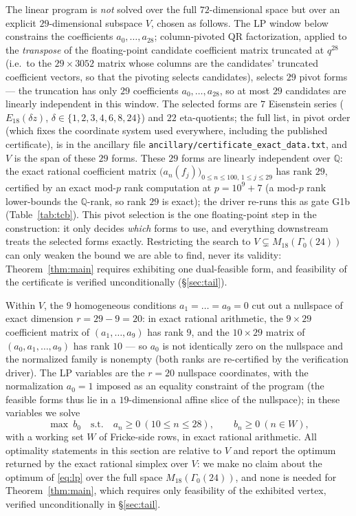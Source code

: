 \documentclass[11pt]{article}
\theoremstyle{remark}
\begin{document}
The linear program is \emph{not} solved over the full $72$-dimensional
space but over an explicit $29$-dimensional subspace $V$, chosen as
follows. The LP window below constrains the coefficients
$a_0,\dots,a_{28}$; column-pivoted QR factorization, applied to the
\emph{transpose} of the floating-point candidate coefficient matrix
truncated at $q^{28}$ (i.e.\ to the $29\times3052$ matrix whose
columns are the candidates' truncated coefficient vectors, so that the
pivoting selects candidates), selects $29$ pivot forms --- the
truncation has only $29$ coefficients $a_0,\dots,a_{28}$, so at most
$29$ candidates are linearly independent in this window. The selected forms are $7$ Eisenstein series
($E_{18}(\delta z)$, $\delta\in\{1,2,3,4,6,8,24\}$) and $22$
eta-quotients; the full list, in pivot order (which fixes the
coordinate system used everywhere, including the published
certificate), is in the ancillary file
\texttt{ancillary/certificate\_exact\_data.txt}, and $V$ is the span
of these $29$ forms. These $29$ forms are linearly independent over
$\mathbb{Q}$: the exact rational coefficient matrix
$\bigl(a_n(f_j)\bigr)_{0\le n\le100,\,1\le j\le29}$ has rank $29$,
certified by an exact mod-$p$ rank computation at $p=10^9+7$ (a mod-$p$
rank lower-bounds the $\mathbb{Q}$-rank, so rank $29$ is exact); the
driver re-runs this as gate G1b (Table~\ref{tab:tcb}). This pivot selection is the one floating-point
step in the construction: it only decides \emph{which} forms to use,
and everything downstream treats the selected forms exactly.
Restricting the search to $V\subsetneq M_{18}(\Gamma_0(24))$ can only
weaken the bound we are able to find, never its validity:
Theorem~\ref{thm:main} requires exhibiting one dual-feasible form, and
feasibility of the certificate is verified unconditionally
(\S\ref{sec:tail}).

Within $V$, the $9$ homogeneous conditions $a_1=\dots=a_9=0$ cut out a
nullspace of exact dimension $r=29-9=20$: in exact rational arithmetic,
the $9\times29$ coefficient matrix of $(a_1,\dots,a_9)$ has rank $9$,
and the $10\times29$ matrix of $(a_0,a_1,\dots,a_9)$ has rank $10$ ---
so $a_0$ is not identically zero on the nullspace and the normalized
family is nonempty (both ranks are re-certified by the verification
driver). The LP variables are
the $r=20$ nullspace coordinates, with the normalization $a_0=1$
imposed as an equality constraint of the program (the feasible forms
thus lie in a $19$-dimensional affine slice of the nullspace); in these
variables we solve
\begin{equation}\label{eq:lp}
\max\ b_0
\quad\text{s.t.}\quad
a_n\ge0\ (10\le n\le 28),\qquad
b_n\ge0\ (n\in W),
\end{equation}
with a working set $W$ of Fricke-side rows, in exact rational
arithmetic. All optimality statements in this section are relative to
$V$ and report the optimum returned by the exact rational simplex over
$V$: we make no claim about the optimum of \eqref{eq:lp} over the full
space $M_{18}(\Gamma_0(24))$, and none is needed for
Theorem~\ref{thm:main}, which requires only feasibility of the exhibited
vertex, verified unconditionally in \S\ref{sec:tail}.
\end{document}
